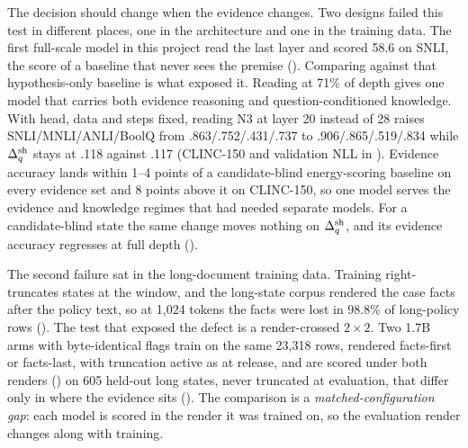 The decision should change when the evidence changes. Two designs failed this test in different places,
one in the architecture and one in the training data. The first full-scale model in this project read
the last layer and scored 58.6 on SNLI, the score of a baseline that never sees the premise
(). Comparing against that hypothesis-only baseline is what exposed
it. Reading at 71\% of depth gives one model that carries both evidence reasoning and question-conditioned
knowledge. With head, data and steps fixed, reading N3 at layer 20 instead of 28 raises
SNLI/MNLI/ANLI/BoolQ from .863/.752/.431/.737 to .906/.865/.519/.834 while $\Delta_q^{\mathrm{sh}}$ stays at .118
against .117 (CLINC-150 and validation NLL in ). Evidence accuracy
lands within 1--4 points of a candidate-blind energy-scoring baseline on every evidence set and 8 points above it on CLINC-150, so one model serves the evidence and knowledge regimes that
had needed separate models. For a candidate-blind state the same change moves nothing on $\Delta_q^{\mathrm{sh}}$, and its evidence accuracy
regresses at full depth ().

\label{sec:results:long}
The second failure sat in the long-document training data. Training right-truncates states at the
window, and the long-state corpus rendered the case facts after the policy text, so at 1{,}024 tokens
the facts were lost in 98.8\% of long-policy rows (). The test that exposed the defect is a render-crossed
$2\times2$. Two 1.7B arms with byte-identical flags train on the same 23{,}318 rows, rendered
facts-first or facts-last, with truncation active as at release, and are scored under both renders
() on 605 held-out long states, never truncated at evaluation, that differ only in
where the evidence sits (). The comparison is a \emph{matched-configuration gap}:
each model is scored in the render it was trained on, so the evaluation render changes along with
training.

